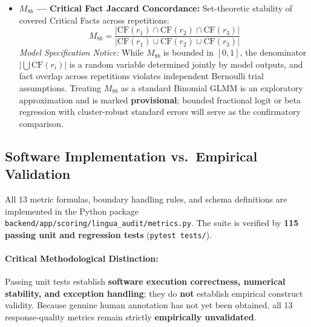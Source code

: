 \documentclass[11pt,a4paper]{article}
\begin{document}
\begin{itemize}
    \emph{Model Specification Notice:} Modeled via a Two-Part Hurdle GLMM (Part 1: Binomial logit for $P(s^2 > 0)$; Part 2: Gamma GLMM for positive variance magnitude). Given only three repetitions ($n=3$, $df=2$) and discrete fact coverage values ($M_{2a} \in \{0, 1/3, 2/3, 1\}$), non-zero sample variances take only sparse discrete rational values (e.g., $1/18, 1/9, 1/6, 1/3$). Fitting a continuous Gamma density to these sparse discrete points is potentially misspecified. We mark the Gamma component of the hurdle model as \textbf{provisional}, retaining discrete count-of-discordant-pairs or non-parametric bootstrap as alternative dispersion models.
  \item \textbf{$M_{8b}$ --- Critical Fact Jaccard Concordance:} Set-theoretic stability of covered Critical Facts across repetitions:
    \begin{equation}
    \label{eq:m8b}
    M_{8b} = \frac{|\text{CF}(r_1) \cap \text{CF}(r_2) \cap \text{CF}(r_3)|}{|\text{CF}(r_1) \cup \text{CF}(r_2) \cup \text{CF}(r_3)|}
    \end{equation}
    \emph{Model Specification Notice:} While $M_{8b}$ is bounded in $[0, 1]$, the denominator $|\bigcup \text{CF}(r_i)|$ is a random variable determined jointly by model outputs, and fact overlap across repetitions violates independent Bernoulli trial assumptions. Treating $M_{8b}$ as a standard Binomial GLMM is an exploratory approximation and is marked \textbf{provisional}; bounded fractional logit or beta regression with cluster-robust standard errors will serve as the confirmatory comparison.
\end{itemize}

\subsection{Software Implementation vs.\ Empirical Validation}
\label{sec:software_vs_empirical}

All 13 metric formulas, boundary handling rules, and schema definitions are implemented in the Python package \texttt{backend/app/scoring/lingua\_audit/metrics.py}. The suite is verified by \textbf{115 passing unit and regression tests} (\texttt{pytest tests/}).

\paragraph{Critical Methodological Distinction:} Passing unit tests establish \textbf{software execution correctness, numerical stability, and exception handling}; they do \textbf{not} establish empirical construct validity. Because genuine human annotation has not yet been obtained, all 13 response-quality metrics remain strictly \textbf{empirically unvalidated}.
\end{document}
